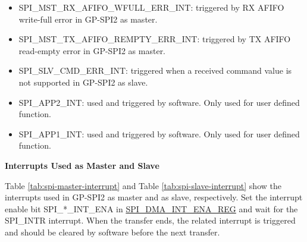 \documentclass[main\_\_EN.tex]{subfiles}
\begin{document}
\begin{itemize}
\item \label{int:SPIMSTRXAFIFOWFULLERRINT}
SPI\_MST\_RX\_AFIFO\_WFULL\_ERR\_INT: triggered by RX AFIFO write-full error in GP-SPI2 as master.

\item \label{int:SPIMSTTXAFIFOREMPTYERRINT}
SPI\_MST\_TX\_AFIFO\_REMPTY\_ERR\_INT: triggered by TX AFIFO read-empty error in GP-SPI2 as master.

\item \label{int:SPISLVCMDERRINT} SPI\_SLV\_CMD\_ERR\_INT: triggered when a received command value is not supported in GP-SPI2 as slave.

\item \label{int:SPIAPP2INT}SPI\_APP2\_INT: used and triggered by software. Only used for user defined function.
\item \label{int:SPIAPP1INT}SPI\_APP1\_INT: used and triggered by software. Only used for user defined function.

\end{itemize}

\textbf{Interrupts Used as Master and Slave}

Table \ref{tab:spi-master-interrupt} and Table \ref{tab:spi-slave-interrupt} show the interrupts used in GP-SPI2 as master and as slave, respectively. Set the interrupt enable bit SPI\_*\_INT\_ENA in \hyperref[regdesc:SPIDMAINTENAREG]{SPI\_DMA\_INT\_ENA\_REG} and wait for the SPI\_INTR interrupt. When the transfer ends, the related interrupt is triggered and should be cleared by software before the next transfer.
\end{document}
